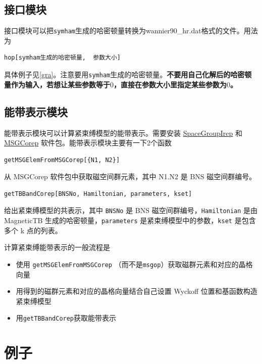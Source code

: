 \documentclass[titlepage,a4paper,12pt,AutoFakeBold]{article}
\begin{document}
\subsection{接口模块}
接口模块可以把\lstinline|symham|生成的哈密顿量转换为wannier90\_hr.dat格式的文件。用法为
\begin{lstlisting}[numbers=none]
hop[symham生成的哈密顿量,  参数大小]
\end{lstlisting}
具体例子见\ref{gra}。注意要用\lstinline|symham|生成的哈密顿量。\textbf{不要用自己化解后的哈密顿量作为输入，若想让某些参数等于$0$，直接在参数大小里指定某些参数为$0$。}

\subsection{能带表示模块}
能带表示模块可以计算紧束缚模型的能带表示。需要安装 \href{https://github.com/goodluck1982/SpaceGroupIrep}{\textsf{SpaceGroupIrep}} 和 \href{https://github.com/goodluck1982/MSGCorep}{\textsf{MSGCorep}} 软件包。能带表示模块主要有一下2个函数

\begin{lstlisting}[numbers=none]
	getMSGElemFromMSGCorep[{N1, N2}]
\end{lstlisting} 
从 \textsf{MSGCorep} 软件包中获取磁空间群元素，其中 N1.N2 是 BNS 磁空间群编号。
\begin{lstlisting}[numbers=none]
	getTBBandCorep[BNSNo, Hamiltonian, parameters, kset]
\end{lstlisting} 
给出紧束缚模型的共表示，其中 \lstinline!BNSNo! 是 BNS 磁空间群编号，\lstinline!Hamiltonian! 是由 \textsf{MagneticTB} 生成的哈密顿量，\lstinline!parameters! 是紧束缚模型中的参数，\lstinline!kset! 是包含多个 k 点的列表。

计算紧束缚能带表示的一般流程是
\begin{itemize}
	\item 使用 \lstinline!getMSGElemFromMSGCorep! （而不是\lstinline|msgop|）获取磁群元素和对应的晶格向量
	\item 用得到的磁群元素和对应的晶格向量结合自己设置 Wyckoff 位置和基函数构造紧束缚模型
	\item 用\lstinline!getTBBandCorep!获取能带表示
\end{itemize}
\section{例子}
\end{document}
